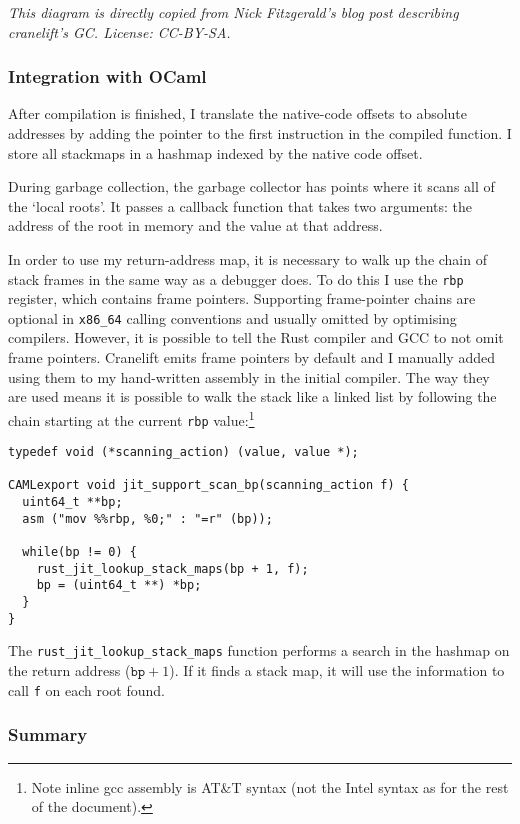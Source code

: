 \noindent\emph{
      This diagram is directly copied from Nick Fitzgerald's blog post \cite{refblog} describing
      cranelift's GC. License: CC-BY-SA.
}

\subsubsection{Integration with OCaml}

After compilation is finished, I translate the native-code offsets to absolute addresses by adding
the
pointer to the first instruction in the compiled function. I store all stackmaps in a hashmap
indexed by the native code offset.

During garbage collection, the garbage collector has points where it scans all of the `local
roots'. It passes a callback function that takes two arguments: the address of the root in
memory
and the value at that address.

In order to use my return-address map, it is necessary to walk up the chain of stack frames in the
same way as a debugger does. To do this I use the \texttt{rbp} register, which contains frame
pointers. Supporting frame-pointer chains are optional in \texttt{x86\_64} calling conventions and
usually omitted by optimising compilers. However, it is possible to tell the Rust compiler and GCC
to not omit frame pointers. Cranelift emits frame pointers by default and I manually added using
them to my hand-written assembly in the initial compiler.
The way they are used means it is possible to walk the stack like a linked list by following the
chain starting at the current \texttt{rbp} value:\footnote{Note inline gcc assembly is AT\&T syntax
      (not the Intel syntax as for the rest of the
      document).}

\begin{verbatim}
typedef void (*scanning_action) (value, value *);

CAMLexport void jit_support_scan_bp(scanning_action f) {
  uint64_t **bp;
  asm ("mov %%rbp, %0;" : "=r" (bp));

  while(bp != 0) {
    rust_jit_lookup_stack_maps(bp + 1, f);
    bp = (uint64_t **) *bp;
  }
}
\end{verbatim}

The \texttt{rust\_jit\_lookup\_stack\_maps} function performs a search in the hashmap on the return
address
($\texttt{bp} + 1$). If it finds a stack map, it will use the information to call \texttt{f} on
each root found.

\subsubsection{Summary}

